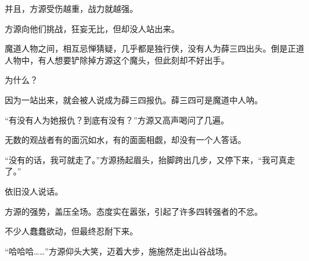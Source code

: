 \begin{this_body}
并且，方源受伤越重，战力就越强。

方源向他们挑战，狂妄无比，但却没人站出来。

魔道人物之间，相互忌惮猜疑，几乎都是独行侠，没有人为薛三四出头。倒是正道人物中，有人想要铲除掉方源这个魔头，但此刻却不好出手。

为什么？

因为一站出来，就会被人说成为薛三四报仇。薛三四可是魔道中人呐。

“有没有人为她报仇？到底有没有？”方源又高声喝问了几遍。

无数的观战者有的面沉如水，有的面面相觑，却没有一个人答话。

“没有的话，我可就走了。”方源扬起眉头，抬脚跨出几步，又停下来，“我可真走了。”

依旧没人说话。

方源的强势，盖压全场。态度实在嚣张，引起了许多四转强者的不忿。

不少人蠢蠢欲动，但最终忍耐下来。

“哈哈哈……”方源仰头大笑，迈着大步，施施然走出山谷战场。

\end{this_body}

